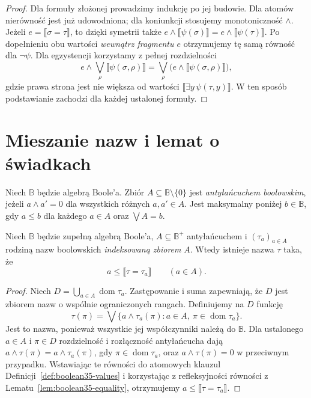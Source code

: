 \begin{proof}
Dla formuły złożonej prowadzimy
indukcję po jej budowie. Dla
atomów nierówność jest już
udowodniona; dla koniunkcji
stosujemy monotoniczność $\wedge$.
Jeżeli $e=\llbracket\sigma=\tau\rrbracket$,
to dzięki symetrii także
$e\wedge\llbracket\psi(\sigma)\rrbracket
=e\wedge\llbracket\psi(\tau)\rrbracket$.
Po dopełnieniu obu wartości
\emph{wewnątrz fragmentu $e$}
otrzymujemy tę samą równość dla
$\neg\psi$. Dla egzystencji
korzystamy z pełnej rozdzielności
\[
 e\wedge\bigvee_{\rho}
   \llbracket\psi(\sigma,\rho)\rrbracket
 =\bigvee_{\rho}
   \bigl(e\wedge
     \llbracket\psi(\sigma,\rho)\rrbracket\bigr),
\]
gdzie prawa strona jest nie większa
od wartości
$\llbracket\exists y\,\psi(\tau,y)\rrbracket$.
W ten sposób podstawianie zachodzi
dla każdej ustalonej formuły.
\end{proof}

\section{Mieszanie nazw i lemat o świadkach}

\begin{definicja}
\label{def:boolean35-antichain}
Niech $\mathbb B$ będzie algebrą Boole'a.
Zbiór $A\subseteq\mathbb B\setminus\{0\}$
jest \emph{antyłańcuchem boolowskim},
jeżeli $a\wedge a'=0$ dla wszystkich
różnych $a,a'\in A$. Jest maksymalny
poniżej $b\in\mathbb B$, gdy
$a\le b$ dla każdego $a\in A$
oraz $\bigvee A=b$.
\end{definicja}

\begin{lemat}
\label{lem:boolean35-mixing}
Niech $\mathbb B$ będzie zupełną
algebrą Boole'a, $A\subseteq\mathbb B^+$
antyłańcuchem i
$(\tau_a)_{a\in A}$ rodziną nazw
boolowskich \emph{indeksowaną zbiorem} $A$.
Wtedy istnieje nazwa $\tau$ taka, że
\[
 a\le\llbracket\tau=\tau_a\rrbracket
 \qquad(a\in A).
\]
\end{lemat}
\begin{proof}
Niech $D=\bigcup_{a\in A}
\operatorname{dom}\tau_a$. Zastępowanie
i suma zapewniają, że $D$ jest zbiorem
nazw o wspólnie ograniczonych rangach.
Definiujemy na $D$ funkcję
\[
 \tau(\pi)=
  \bigvee\{a\wedge\tau_a(\pi):
       a\in A,\ \pi\in\operatorname{dom}\tau_a\}.
\]
Jest to nazwa, ponieważ wszystkie
jej współczynniki należą do $\mathbb B$.
Dla ustalonego $a\in A$ i $\pi\in D$
rozdzielność i rozłączność
antyłańcucha dają
$a\wedge\tau(\pi)=
 a\wedge\tau_a(\pi)$, gdy
$\pi\in\operatorname{dom}\tau_a$,
oraz $a\wedge\tau(\pi)=0$ w przeciwnym
przypadku. Wstawiając te równości
do atomowych klauzul
Definicji~\ref{def:boolean35-values}
i korzystając z refleksyjności
równości z Lematu~\ref{lem:boolean35-equality},
otrzymujemy
$a\le\llbracket\tau=\tau_a\rrbracket$.
\end{proof}

